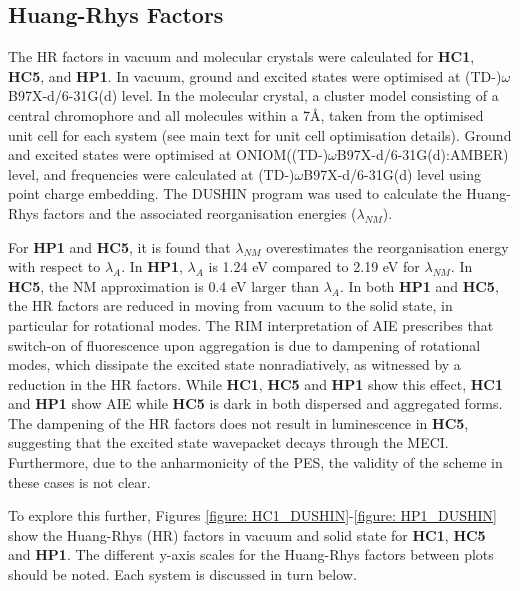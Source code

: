 \subsection{Huang-Rhys Factors}\label{section: HR}
The \ac{HR} factors in vacuum and molecular crystals were calculated for \textbf{HC1}, \textbf{HC5}, and \textbf{HP1}. In vacuum, ground and excited states were optimised at (TD-)$\omega$B97X-d/6-31G(d) level. In the molecular crystal, a cluster model consisting of a central chromophore and all molecules within a 7\AA{}, taken from the optimised unit cell for each system (see main text for unit cell optimisation details). Ground and excited states were optimised at ONIOM((TD-)$\omega$B97X-d/6-31G(d):AMBER) level, and frequencies were calculated at (TD-)$\omega$B97X-d/6-31G(d) level using point charge embedding. The DUSHIN program was used to calculate the Huang-Rhys factors and the associated reorganisation energies ($\lambda_{NM}$).\cite{Reimers2001}

For \textbf{HP1} and \textbf{HC5}, it is found that $\lambda_{NM}$ overestimates the reorganisation energy with respect to $\lambda_{A}$. In \textbf{HP1},  $\lambda_{A}$ is 1.24 eV compared to 2.19 eV for $\lambda_{NM}$. In \textbf{HC5}, the NM approximation is 0.4 eV larger than $\lambda_{A}$. In both \textbf{HP1} and \textbf{HC5}, the HR factors are reduced in moving from vacuum to the solid state, in particular for rotational modes. The RIM interpretation of AIE prescribes that switch-on of fluorescence upon aggregation is due to dampening of rotational modes, which dissipate the excited state nonradiatively, as witnessed by a reduction in the HR factors. While \textbf{HC1}, \textbf{HC5} and \textbf{HP1} show this effect, \textbf{HC1} and \textbf{HP1} show AIE while \textbf{HC5} is dark in both dispersed and aggregated forms. The dampening of the HR factors does not result in luminescence in \textbf{HC5}, suggesting that the excited state wavepacket decays through the MECI.\cite{Dommett2017} Furthermore, due to the anharmonicity of the PES, the validity of the scheme in these cases is not clear.

To explore this further, Figures \ref{figure: HC1_DUSHIN}-\ref{figure: HP1_DUSHIN} show the Huang-Rhys (HR) factors in vacuum and solid state for \textbf{HC1}, \textbf{HC5} and \textbf{HP1}. The different y-axis scales for the Huang-Rhys factors between plots should be noted. Each system is discussed in turn below.

